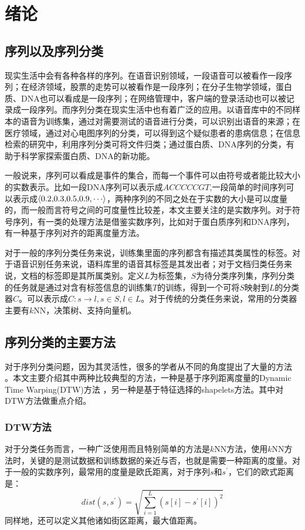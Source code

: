 \chapter{绪论}
\section{序列以及序列分类}
现实生活中会有各种各样的序列。在语音识别领域，一段语音可以被看作一段序列；在经济领域，股票的走势可以被看作是一段序列；在分子生物学领域，蛋白质、DNA也可以看成是一段序列；在网络管理中，客户端的登录活动也可以被记录成一段序列。而序列分类在现实生活中也有着广泛的应用。以语音库中的不同样本的语音为训练集，通过对需要测试的语音进行分类，可以识别出语音的来源；在医疗领域，通过对心电图序列的分类，可以得到这个疑似患者的患病信息；在信息检索的研究中，利用序列分类可将文件归类；通过蛋白质、DNA序列的分类，有助于科学家探索蛋白质、DNA的新功能\cite{Xing2010}。

一般说来，序列可以看成是事件的集合，而每一个事件可以由符号或者能比较大小的实数表示。比如一段DNA序列可以表示成$ACCCCCGT$,一段简单的时间序列可以表示成$\left\langle {0.2{\rm{,}}0.3{\rm{,}}0.5{\rm{,}}0.9{\rm{,}} \cdots } \right\rangle $，两种序列的不同之处在于实数的大小是可以度量的，而一般而言符号之间的可度量性比较差，本文主要关注的是实数序列。对于符号序列，有一类的处理方法是借鉴实数序列，比如对于蛋白质序列和DNA序列，有一种基于序列对齐的距离度量方法\cite{kajan2006application}。

对于一般的序列分类任务来说，训练集里面的序列都含有描述其类属性的标签。对于语音识别任务来说，语料库里的语音其标签是其发出者；对于文档归类任务来说，文档的标签即是其所属类别。定义$L$为标签集，$S$为待分类序列集，序列分类的任务就是通过对含有标签信息的训练集$T$的训练，得到一个可将$S$映射到$L$的分类器$C$。可以表示成$C:s \to l,s \in S,l \in L$。对于传统的分类任务来说，常用的分类器主要有$k$NN，决策树、支持向量机\cite{Wu2008}。

\section{序列分类的主要方法}
对于序列分类问题，因为其灵活性，很多的学者从不同的角度提出了大量的方法\cite{Al-Naymat2009}\cite{Keogh2000}\cite{Salvador2007}
\cite{Thrun2000}\cite{Xi2006}\cite{Ye2009}。本文主要介绍其中两种比较典型的方法，一种是基于序列距离度量的Dynamic Time Warping(DTW)方法\cite{Al-Naymat2009}\cite{Batista2011}\cite{Keogh2000}\cite{LESLIE2001}\cite{Lin2007}\cite{Salvador2007}
\cite{Xi2006}，另一种是基于特征选择的shapelets方法\cite{Ye2009}。其中对DTW方法做重点介绍。
\subsection{DTW方法}
对于分类任务而言，一种广泛使用而且特别简单的方法是$k$NN方法，使用$k$NN方法时，关键的是测试数据和训练数据的亲近与否，也就是需要一种距离的度量。对于一般的实数序列，最常用的度量是欧氏距离，对于序列$s$和$s^{'}$，它们的欧式距离是：
\[dist\left( {s,{s^{'}}} \right) = \sqrt {\sum\limits_{i = 1}^L {{{\left( {s\left[ i \right] - {s^{'}}\left[ i \right]} \right)}^2}} } \]
同样地，还可以定义其他诸如街区距离，最大值距离。

